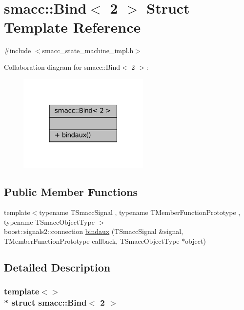 \hypertarget{structsmacc_1_1Bind_3_012_01_4}{}\section{smacc\+:\+:Bind$<$ 2 $>$ Struct Template Reference}
\label{structsmacc_1_1Bind_3_012_01_4}


{\ttfamily \#include $<$smacc\+\_\+state\+\_\+machine\+\_\+impl.\+h$>$}



Collaboration diagram for smacc\+:\+:Bind$<$ 2 $>$\+:
\nopagebreak
\begin{figure}[H]
\begin{center}
\leavevmode
\includegraphics[width=184pt]{structsmacc_1_1Bind_3_012_01_4__coll__graph}
\end{center}
\end{figure}
\subsection*{Public Member Functions}
\begin{DoxyCompactItemize}
\item 
{\footnotesize template$<$typename T\+Smacc\+Signal , typename T\+Member\+Function\+Prototype , typename T\+Smacc\+Object\+Type $>$ }\\boost\+::signals2\+::connection \hyperlink{structsmacc_1_1Bind_3_012_01_4_ad974781e83d154953d6a4ae0f3632a8f}{bindaux} (T\+Smacc\+Signal \&signal, T\+Member\+Function\+Prototype callback, T\+Smacc\+Object\+Type $\ast$object)
\end{DoxyCompactItemize}


\subsection{Detailed Description}
\subsubsection*{template$<$$>$\\*
struct smacc\+::\+Bind$<$ 2 $>$}




